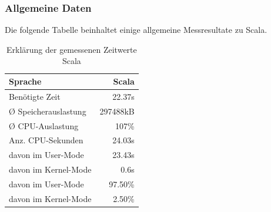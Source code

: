 \documentclass{fancydocument}
\begin{document}
\subsubsection{Allgemeine Daten}
Die folgende Tabelle beinhaltet einige allgemeine Messresultate zu Scala. 
\begin{table}[h!]
\centering
\begin{tabular}{|p{6cm}|r|} \hline
Sprache & Scala\\
\hline
Benötigte Zeit & 22.37s\\
\hline
Ø Speicherauslastung & 297488kB\\
\hline
Ø CPU-Auslastung & 107\%\\
\hline
Anz. CPU-Sekunden & 24.03s\\
\hline
davon im User-Mode & 23.43s\\
\hline
davon im Kernel-Mode & 0.6s\\
\hline
davon im User-Mode & 97.50\%\\
\hline
davon im Kernel-Mode & 2.50\%\\
\hline
\end{tabular}
\caption{Erklärung der gemessenen Zeitwerte Scala}
\end{table}
\end{document}

